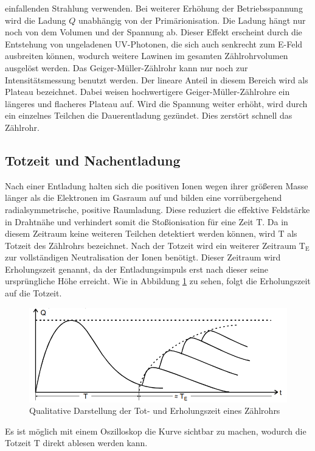 einfallenden Strahlung verwenden.
Bei weiterer Erhöhung der Betriebsspannung wird die Ladung $Q$ unabhängig von der Primärionisation. 
Die Ladung hängt nur noch von dem Volumen und der Spannung ab. Dieser Effekt erscheint durch die Entstehung von ungeladenen UV-Photonen, die sich auch senkrecht zum E-Feld
ausbreiten können, wodurch weitere Lawinen im gesamten Zählrohrvolumen ausgelöst werden. 
Das Geiger-Müller-Zählrohr kann nur noch zur Intensitätsmessung benutzt werden.
Der lineare Anteil in diesem Bereich wird als Plateau bezeichnet. Dabei weisen hochwertigere Geiger-Müller-Zählrohre ein längeres und flacheres Plateau auf.
Wird die Spannung weiter erhöht, wird durch ein einzelnes Teilchen die Dauerentladung gezündet. Dies zerstört schnell das Zählrohr.
\subsection{Totzeit und Nachentladung}
Nach einer Entladung halten sich die positiven Ionen wegen ihrer größeren Masse länger als die Elektronen im Gasraum auf
und bilden eine vorrübergehend radialsymmetrische, positive Raumladung.
Diese reduziert die effektive Feldstärke in Drahtnähe und verhindert somit die Stoßionisation für eine Zeit $\text{T}$.
Da in diesem Zeitraum keine weiteren Teilchen detektiert werden können, wird $\text{T}$ als Totzeit des Zählrohrs bezeichnet.
Nach der Totzeit wird ein weiterer Zeitraum $\text{T}_\text{E}$ zur vollständigen Neutralisation der Ionen benötigt.
Dieser Zeitraum wird Erholungszeit genannt, da der Entladungsimpuls erst nach dieser seine ursprüngliche Höhe erreicht.
Wie in Abbildung \ref{fig:tot} zu sehen, folgt die Erholungszeit auf die Totzeit.
\begin{figure}
  \centering
  \includegraphics[scale=0.6]{pics/totzeit.png}
  \caption{Qualitative Darstellung der Tot- und Erholungszeit eines Zählrohrs}
  \label{fig:tot}
\end{figure}
Es ist möglich mit einem Oszilloskop die Kurve sichtbar zu machen, wodurch die Totzeit $\text{T}$ direkt ablesen werden kann.
